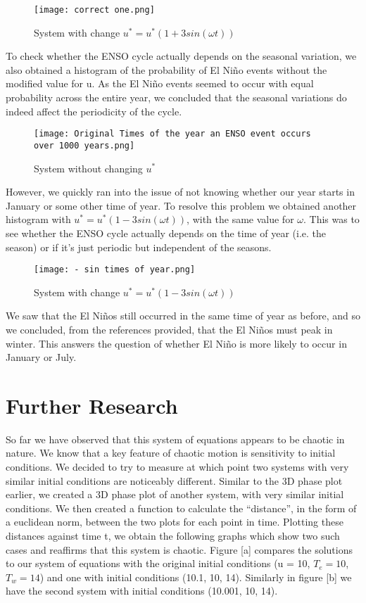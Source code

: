 \documentclass{article}
\begin{document}
\begin{figure}[h]
\centering
\texttt{[image: correct one.png]}
\caption{\label{fig:Diagram}System with change $u^* = u^* ( 1 + 3 sin(\omega t))$}
\end{figure}

To check whether the ENSO cycle actually depends on the seasonal variation, we also obtained a histogram of the probability of El Niño events without the modified value for u. As the El Niño events seemed to occur with equal probability across the entire year, we concluded that the seasonal variations do indeed affect the periodicity of the cycle. 

\begin{figure}[h]
\centering
\texttt{[image: Original Times of the year an ENSO event occurs over 1000 years.png]}
\caption{\label{fig:Diagram}System without changing $u^*$}
\end{figure}

\newpage

However, we quickly ran into the issue of not knowing whether our year starts in January or some other time of year. To resolve this problem we obtained another histogram with $u^* = u^* ( 1 - 3 sin(\omega t))$, with the same value for $\omega$. This was to see whether the ENSO cycle actually depends on the time of year (i.e. the season) or if it’s just periodic but independent of the seasons.

\begin{figure}[h]
\centering
\texttt{[image: - sin times of year.png]}
\caption{\label{fig:Diagram}System with change $u^* = u^* ( 1 - 3 sin(\omega t))$}
\end{figure}
 
We saw that the El Niños still occurred in the same time of year as before, and so we concluded, from the references provided, that the El Niños must peak in winter. This answers the question of whether El Niño is more likely to occur in January or July. 

\newpage

\section{Further Research}

So far we have observed that this system of equations appears to be chaotic in nature. We know that a key feature of chaotic motion is sensitivity to initial conditions. We decided to try to measure at which point two systems with very similar initial conditions are noticeably different.
Similar to the 3D phase plot earlier, we created a 3D phase plot of another system, with very similar initial conditions. We then created a function to calculate the “distance”, in the form of a euclidean norm, between the two plots for each point in time. Plotting these distances against time t, we obtain the following graphs which show two such cases and reaffirms that this system is chaotic. Figure [a] compares the solutions to our system of equations with the original initial conditions (u = 10, $T_e =  10$, $T_w = 14$) and one with initial conditions (10.1, 10, 14). Similarly in figure [b] we have the second system with initial conditions (10.001, 10, 14).
\end{document}
